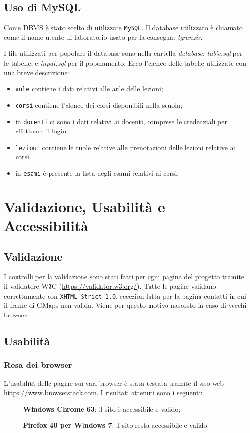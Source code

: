 \documentclass[12pt, a4paper]{article}
\begin{document}
\subsection{Uso di MySQL}
Come DBMS è stato scelto di utilizzare \texttt{MySQL}. Il database utilizzato è chiamato 
come il nome utente di laboratorio usato per la consegna: \textit{tgranzie}.\par 
I file utilizzati per popolare il database sono nella cartella \mbox{\textit{database}}: \mbox{\textit{table.sql}} per le tabelle, e \mbox{\textit{input.sql}} per il popolamento. 
Ecco l'elenco delle tabelle utilizzate con una breve descrizione:

\begin{itemize}
	\item \texttt{aule} contiene i dati relativi alle aule delle lezioni;
	\item \texttt{corsi} contiene l'elenco dei corsi disponibili nella scuola;
	\item in \texttt{docenti} ci sono i dati relativi ai docenti, comprese le 
	credenziali per effettuare il login;
	\item \texttt{lezioni} contiene le tuple relative alle prenotazioni delle 
	lezioni relative ai corsi.
	\item in \texttt{esami} è presente la lista degli esami relativi ai corsi;
\end{itemize}

\section{Validazione, Usabilità e Accessibilità}

\subsection{Validazione}
I controlli per la validazione sono stati fatti per ogni pagina del progetto tramite il
validatore W3C (\mbox{\url{https://validator.w3.org/}}). Tutte le pagine validano correttamente con \texttt{\mbox{XHTML Strict 1.0}}, eccezion fatta per la pagina contatti in cui il frame
di GMaps non valida. Viene per questo motivo nascosto in caso di vecchi browser.\par

\subsection{Usabilità}

\subsubsection{Resa dei browser}
L'usabilità delle pagine sui vari browser è stata testata tramite il sito web \mbox{\url{https://www.browserstack.com}}. I risultati ottenuti sono i seguenti:
\begin{itemize}
	\item[$-$] \textbf{Windows Chrome 63}: il sito è accessibile e valido;
	\item[$-$] \textbf{Firefox 40 per Windows 7}: il sito resta accessibile e valido.
\end{itemize}
\end{document}
